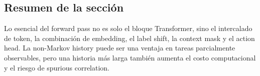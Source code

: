 \subsection{Resumen de la sección}

Lo esencial del forward pass no es solo el bloque Transformer, sino el intercalado de token, la combinación de embedding, el label shift, la context mask y el action head. La non-Markov history puede ser una ventaja en tareas parcialmente observables, pero una historia más larga también aumenta el costo computacional y el riesgo de spurious correlation.
